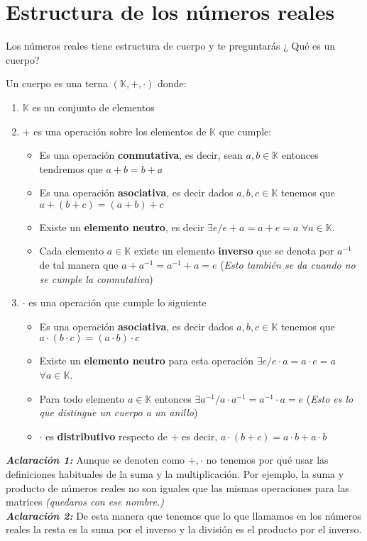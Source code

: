 \section{Estructura de los números reales}
Los números reales tiene estructura de cuerpo y te preguntarás ¿ Qué es un cuerpo?
\begin{defi}
Un cuerpo es una terna $(\mathbb{K},+,\cdot)$ donde:
\begin{enumerate}
\item $\mathbb{K}$ es un conjunto de elementos 
\item $+$ es una operación sobre los elementos de $\mathbb{K}$ que cumple:
\begin{itemize}
\item Es una operación \textbf{conmutativa}, es decir, sean $a,b\in \mathbb{K}$ entonces tendremos que $a+b=b+a$
\item Es una operación \textbf{asociativa}, es decir dados $a,b,c \in \mathbb{K}$ tenemos que $a+(b+c)=(a+b)+c$
\item Existe un \textbf{elemento neutro}, es decir $\exists e / e+a=a+e=a$ $\forall a \in \mathbb{K}$.
\item Cada elemento $a \in \mathbb{K} $ existe un elemento \textbf{inverso} que se denota por $a^{-1} $ de tal manera que $a+a^{-1}=a^{-1}+a=e$ (\emph{Esto también se da cuando no se cumple la conmutativa})
\end{itemize}

\item $\cdot$ es una operación que cumple lo siguiente 
\begin{itemize}

\item Es una operación \textbf{asociativa}, es decir dados $a,b,c \in \mathbb{K}$ tenemos que $a\cdot(b\cdot c)=(a\cdot b)\cdot c$

\item Existe un \textbf{elemento neutro} para esta operación  $\exists e / e\cdot a=a \cdot e=a$ $\forall a \in \mathbb{K}$.

\item Para todo elemento $a \in \mathbb{K}$ entonces $\exists a^{-1} /  a \cdot a^{-1}=a^{-1}\cdot a=e $ (\emph{Esto es lo que distingue un cuerpo a un anillo})

\item $\cdot$ es \textbf{distributivo} respecto de $+$ es decir, $a\cdot (b+c)=a \cdot b + a \cdot b$

\end{itemize}
\end{enumerate}

  
\end{defi}
\newpage
\noindent
\textbf{\emph{Aclaración 1: }} Aunque se denoten como $+, \cdot$ no tenemos por qué usar las definiciones habituales de la suma y la multiplicación. Por ejemplo, la suma y producto de números reales no son iguales que las mismas operaciones para las matrices \emph{(quedaros con ese nombre.) } \\
\textbf{\emph{Aclaración 2: }}  De esta manera que tenemos que lo que llamamos en los números reales la resta es la suma por el inverso y la división es el producto por el inverso.

